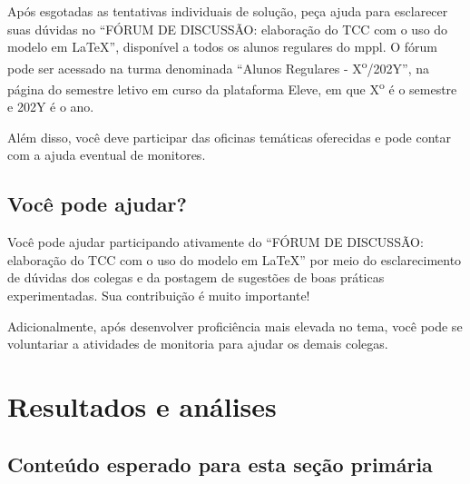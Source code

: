 Após esgotadas as tentativas individuais de solução, peça ajuda para esclarecer suas dúvidas no ``FÓRUM DE DISCUSSÃO: elaboração do TCC com o uso do modelo em LaTeX'', disponível a todos os alunos regulares do \ac{mppl}. O fórum pode ser acessado na turma denominada ``Alunos Regulares - X\textsuperscript{o}/202Y'', na página do semestre letivo em curso da plataforma Eleve, em que X\textsuperscript{o} é o semestre e 202Y é o ano.

Além disso, você deve participar das oficinas temáticas oferecidas e pode contar com a ajuda eventual de monitores.

\section{Você pode ajudar?}

Você pode ajudar participando ativamente do ``FÓRUM DE DISCUSSÃO: elaboração do TCC com o uso do modelo em LaTeX'' por meio do esclarecimento de dúvidas dos colegas e da postagem de sugestões de boas práticas experimentadas. Sua contribuição é muito importante! 

Adicionalmente, após desenvolver proficiência mais elevada no tema, você pode se voluntariar a atividades de monitoria para ajudar os demais colegas.


\chapter{Resultados e análises}\label{sec-ResAn} %
\section{Conteúdo esperado para esta seção primária}

